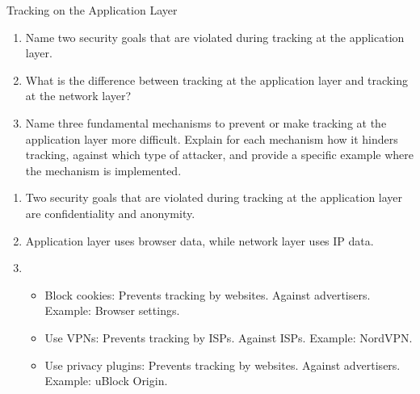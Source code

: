 \documentclass{article}
\begin{document}
\begin{exercise}{Tracking on the Application Layer}
  \begin{enumerate}
    \item Name two security goals that are violated during tracking at the application layer.
    \item What is the difference between tracking at the application layer and tracking at the network layer?
    \item Name three fundamental mechanisms to prevent or make tracking at the application layer more difficult. Explain for each mechanism how it hinders tracking, against which type of attacker, and provide a specific example where the mechanism is implemented.
  \end{enumerate}

  \begin{solution}
    \begin{enumerate}
      \item Two security goals that are violated during tracking at the application layer are confidentiality and anonymity.
      \item Application layer uses browser data, while network layer uses IP data.
      \item \begin{itemize}
          \item Block cookies: Prevents tracking by websites. Against advertisers. Example: Browser settings.
          \item Use VPNs: Prevents tracking by ISPs. Against ISPs. Example: NordVPN.
          \item Use privacy plugins: Prevents tracking by websites. Against advertisers. Example: uBlock Origin.
        \end{itemize}
    \end{enumerate}
  \end{solution}
\end{exercise}
\end{document}
